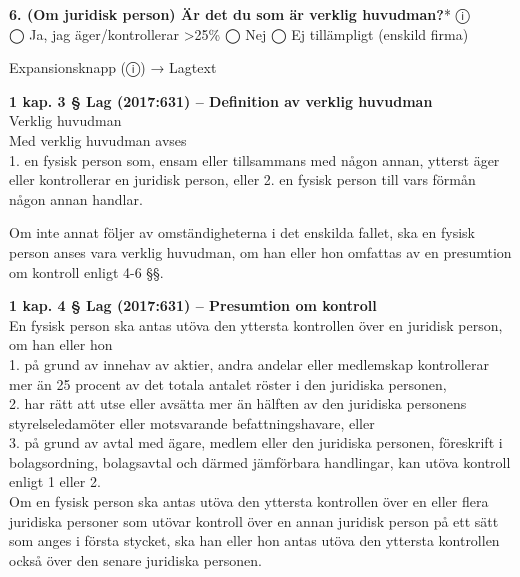 \documentclass[10pt]{beamer}
\begin{document}
\begin{frame}[label=riskfragor-steg1]
  \vspace{0.2cm}

  \textbf{6. (Om juridisk person) Är det du som är verklig huvudman?}* \hspace{0.3cm} ⓘ\\
  \tiny
  ◯ Ja, jag äger/kontrollerar >25\% \hspace{0.5cm} ◯ Nej \hspace{0.5cm} ◯ Ej tillämpligt (enskild firma)
  \begin{alertblock}{Expansionsknapp (ⓘ) → Lagtext}

    \tiny \textbf{ 1 kap. 3 § Lag (2017:631) – Definition av verklig huvudman}\\
    \tiny Verklig huvudman\\

    \tiny   Med verklig huvudman avses\\
    \tiny  1. en fysisk person som, ensam eller tillsammans med någon annan,
     ytterst äger eller kontrollerar en juridisk person, eller
    \tiny   2. en fysisk person till vars förmån någon annan handlar.

    \tiny Om inte annat följer av omständigheterna i det enskilda fallet, ska en fysisk person
     anses vara verklig huvudman, om han eller hon omfattas av en presumtion om kontroll enligt 4-6 §§.
    \vspace{0.1cm}

    \tiny \textbf{ 1 kap. 4 § Lag (2017:631) – Presumtion om kontroll}\\
    \tiny  En fysisk person ska antas utöva den yttersta kontrollen över en juridisk person,
     om han eller hon\\
    \tiny   1. på grund av innehav av aktier, andra andelar eller medlemskap kontrollerar mer än 25 procent
     av det totala antalet röster i den juridiska personen,\\
    \tiny   2. har rätt att utse eller avsätta mer än hälften av den juridiska personens
     styrelseledamöter eller motsvarande befattningshavare, eller\\
    \tiny   3. på grund av avtal med ägare, medlem eller den juridiska personen,
     föreskrift i bolagsordning, bolagsavtal och därmed jämförbara handlingar, 
     kan utöva kontroll enligt 1 eller 2.\\

    \tiny Om en fysisk person ska antas utöva den yttersta kontrollen över en eller flera
     juridiska personer som utövar kontroll över en annan juridisk person på ett sätt som 
     anges i första stycket, ska han eller hon antas utöva den yttersta kontrollen också 
     över den senare juridiska personen.
    \vspace{0.1cm}


\end{alertblock}
\end{frame}
\end{document}
